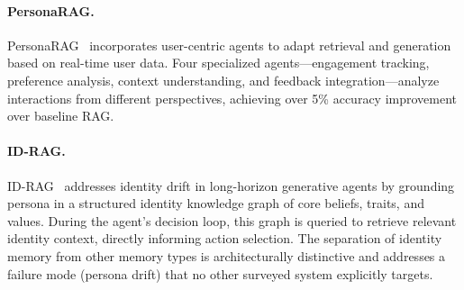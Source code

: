 \paragraph{PersonaRAG.}
PersonaRAG~\cite{personarag2024} incorporates user-centric agents to
adapt retrieval and generation based on real-time user data.  Four
specialized agents---engagement tracking, preference analysis, context
understanding, and feedback integration---analyze interactions from
different perspectives, achieving over 5\% accuracy improvement over
baseline RAG.

\paragraph{ID-RAG.}
ID-RAG~\cite{idrag2025} addresses identity drift in long-horizon
generative agents by grounding persona in a structured identity
knowledge graph of core beliefs, traits, and values.  During the agent's
decision loop, this graph is queried to retrieve relevant identity
context, directly informing action selection.  The separation of identity
memory from other memory types is architecturally distinctive and
addresses a failure mode (persona drift) that no other surveyed system
explicitly targets.


